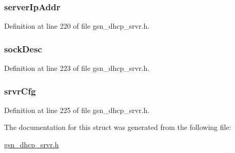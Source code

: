 \hypertarget{a00043_a09261ac30de0001f89753c8f3869ad2f}{
\subsubsection[{serverIpAddr}]{ {\bf serverIpAddr}}}
\label{a00043_a09261ac30de0001f89753c8f3869ad2f}


Definition at line 220 of file gsn\_\-dhcp\_\-srvr.h.

\hypertarget{a00043_a4664a1e7fa506ea9a7864c6847d8af4b}{
\subsubsection[{sockDesc}]{ {\bf sockDesc}}}
\label{a00043_a4664a1e7fa506ea9a7864c6847d8af4b}


Definition at line 223 of file gsn\_\-dhcp\_\-srvr.h.

\hypertarget{a00043_a68dcf77b495ff3cbf9a6ef828ce8542e}{
\subsubsection[{srvrCfg}]{ {\bf srvrCfg}}}
\label{a00043_a68dcf77b495ff3cbf9a6ef828ce8542e}


Definition at line 225 of file gsn\_\-dhcp\_\-srvr.h.



The documentation for this struct was generated from the following file:\begin{DoxyCompactItemize}
\item 
\hyperlink{a00482}{gsn\_\-dhcp\_\-srvr.h}\end{DoxyCompactItemize}
